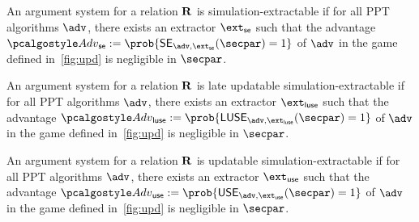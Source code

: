 \begin{definition}\label{se}
	An argument system for a relation $\mathbf{R}$ is simulation-extractable if for all PPT algorithms $\advse$, there exists an extractor $\ext_{\se}$ such that the advantage $\Adv_{\se}:=\prob{ \SE_{\advse,\ext_{\se}}(\secpar) = 1}$ of $\advse$ in the game defined in~\cref{fig:upd} is negligible in $\secpar$.
\end{definition}

\begin{definition}\label{late-use}
	An argument system for a relation $\mathbf{R}$ is late updatable simulation-extractable if for all PPT algorithms $\advse$, there exists an extractor $\ext_{\luse}$ such that the advantage $\Adv_{\luse}:=\prob{ \LUSE_{\advse,\ext_{\luse}}(\secpar) = 1}$ of $\advse$ in the game defined in~\cref{fig:upd} is negligible in $\secpar$.
\end{definition}

\begin{definition}\label{USE}
	An argument system for a relation $\mathbf{R}$ is updatable simulation-extractable if for all PPT algorithms $\advse$, there exists an extractor $\ext_{\use}$ such that the advantage $\Adv_{\use} := \prob{ \USE_{\advse,\ext_{\use}}(\secpar) = 1}$ of $\advse$ in the game defined in~\cref{fig:upd} is negligible in $\secpar$.
\end{definition}

